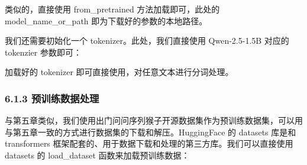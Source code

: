 \documentclass[12pt,a4paper]{book}
\begin{document}
\begin{Shaded}
\begin{Highlighting}[]

\OperatorTok{=}\OperatorTok{=}\NormalTok{)}
\end{Highlighting}
\end{Shaded}

类似的，直接使用 from\_pretrained 方法加载即可，此处的
model\_name\_or\_path 即为下载好的参数的本地路径。

我们还需要初始化一个 tokenizer。此处，我们直接使用 Qwen-2.5-1.5B 对应的
tokenzier 参数即可：

\begin{Shaded}
\begin{Highlighting}[]

\OperatorTok{=}
\end{Highlighting}
\end{Shaded}

加载好的 tokenizer 即可直接使用，对任意文本进行分词处理。

\subsubsection{6.1.3
预训练数据处理}\label{ux9884ux8badux7ec3ux6570ux636eux5904ux7406}

与第五章类似，我们使用出门问问序列猴子开源数据集作为预训练数据集，可以用与第五章一致的方式进行数据集的下载和解压。HuggingFace
的 datasets 库是和 transformers
框架配套的、用于数据下载和处理的第三方库。我们可以直接使用 datasets 的
load\_dataset 函数来加载预训练数据：

\begin{Shaded}
\begin{Highlighting}[]

\OperatorTok{=}\OperatorTok{=}\NormalTok{)}
\end{Highlighting}
\end{Shaded}
\end{document}
